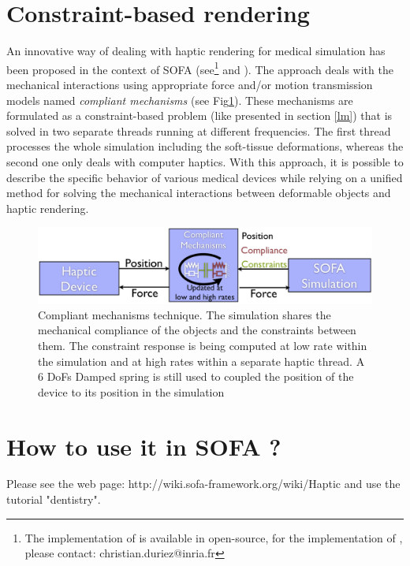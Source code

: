 \section{Constraint-based rendering} An innovative way of dealing with haptic rendering for medical simulation has been proposed in the context of SOFA (see\footnote{The implementation of  \cite{Saupin08} is available in open-source, for the implementation of \cite{Peterlik11}, please contact: christian.duriez@inria.fr }  \cite{Saupin08} and \cite{Peterlik11}). 
The approach deals with the mechanical interactions using appropriate force and/or motion transmission models named \emph{compliant mechanisms} (see Fig\ref{fig:haptic3}). 
These mechanisms are formulated as a constraint-based problem (like presented in section \ref{lm}) that is solved in two separate threads running at different frequencies. 
The first thread processes the whole simulation including the soft-tissue deformations, whereas the second one only deals with computer haptics. 
With this approach, it is possible to describe the specific behavior of various medical devices while relying on a unified method for solving the mechanical interactions between deformable objects and haptic rendering.  
\begin{figure}
\centering
 \includegraphics[width=\linewidth]{haptic3.png}
 \caption{Compliant mechanisms technique. The simulation shares the mechanical compliance of the objects and the constraints between them. The constraint response is being computed at low rate within the simulation and at high rates within a separate haptic thread. A 6 DoFs Damped spring is still used to coupled the position of the device to its position in the simulation}
 \label{fig:haptic3}
\end{figure}

\section{How to use it in SOFA ?}
Please see the web page: http://wiki.sofa-framework.org/wiki/Haptic  and use the tutorial "dentistry".

